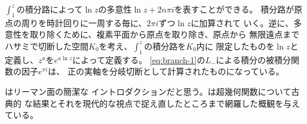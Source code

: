 \documentclass{jsarticle}
\begin{document}
$\int_1^z$の積分路によって$\ln z$の多意性$\ln z+2n\pi i$を表すことができる。
積分路が原点の周りを時計回りに一周する毎に、$2\pi i$ずつ$\ln z$に加算されて
いく。逆に、多意性を取り除くために、複素平面から原点を取り除き、原点から
無限遠点までハサミで切断した空間$K_0$を考え、$\int_1^z$の積分路を$K_0$内に
限定したものを$\ln z$と定義し、$z^a$を$e^{a\ln z}$によって定義する。
\eqref{eq:branch-1}の$L_-$による積分の被積分関数の因子$e^{\pi i}$は、
正の実軸を分岐切断として計算されたものになっている。

\cite{hb3.s6:online}\cite{www.e5:online}はリーマン面の簡潔な
イントロダクションだと思う。\cite{www.s3:online}は超幾何関数について古典的
な結果とそれを現代的な視点で捉え直したところまで網羅した概観を与えている。



\end{document}
